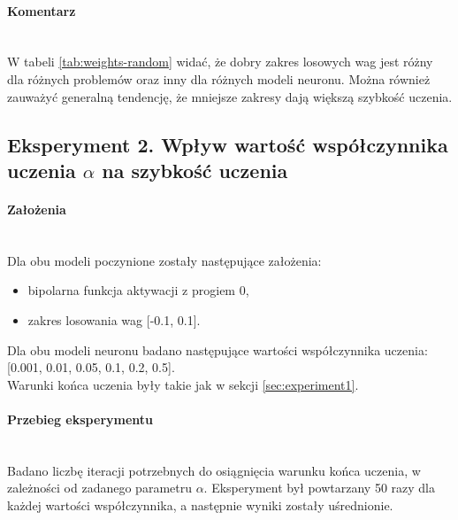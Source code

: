 \documentclass{article}
\begin{document}
	\paragraph{Komentarz}\mbox{}\\
	W tabeli \ref{tab:weights-random} widać, że dobry zakres losowych wag jest różny dla różnych problemów oraz inny dla różnych modeli neuronu.
	Można również zauważyć generalną tendencję, że mniejsze zakresy dają większą szybkość uczenia.

	\subsection*{Eksperyment 2. Wpływ wartość współczynnika uczenia $\alpha$ na szybkość uczenia}
	\paragraph{Założenia}\mbox{}\\
	Dla obu modeli poczynione zostały następujące założenia:
	\begin{itemize}
		\item bipolarna funkcja aktywacji z progiem 0,
		\item zakres losowania wag [-0.1, 0.1].
	\end{itemize}
	Dla obu modeli neuronu badano następujące wartości współczynnika uczenia: [0.001, 0.01, 0.05, 0.1, 0.2, 0.5].
	\\Warunki końca uczenia były takie jak w sekcji \ref{sec:experiment1}.
	\paragraph{Przebieg eksperymentu}\mbox{}\\
	Badano liczbę iteracji potrzebnych do osiągnięcia warunku końca uczenia, w zależności od zadanego parametru $\alpha$.
	Eksperyment był powtarzany 50 razy dla każdej wartości współczynnika, a następnie wyniki zostały uśrednionie.
\end{document}
